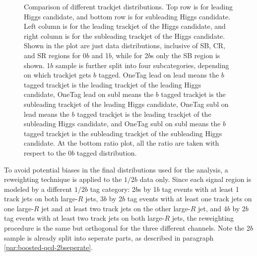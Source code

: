 \begin{figure}[htbp!]
\begin{center}
\caption{Comparison of different trackjet \pt distributions. Top row is for leading \pt Higgs candidate, and bottom row is for subleading \pt Higgs candidate. Left column is for the leading \pt trackjet of the Higgs candidate, and right column is for the subleading \pt trackjet of the Higgs candidate. Shown in the plot are just data distributions, inclusive of SB, CR, and SR regions for 0$b$ and 1$b$, while for 2$b$s only the SB region is shown. 1$b$ sample is further split into four subcategories, depending on which trackjet gets $b$ tagged. OneTag lead on lead means the $b$ tagged trackjet is the leading trackjet of the leading Higgs candidate, OneTag lead on subl means the $b$ tagged trackjet is the subleading trackjet of the leading Higgs candidate, OneTag subl on lead means the $b$ tagged trackjet is the leading trackjet of the subleading Higgs candidate, and OneTag subl on subl means the $b$ tagged trackjet is the subleading trackjet of the subleading Higgs candidate. At the bottom ratio plot, all the ratio are taken with respect to the 0$b$ tagged distribution.}
\label{fig:rw-2bs-comp}
\end{center}
\end{figure}

To avoid potential biases in the final distributions used for the analysis, a reweighting technique is applied to the $1/2b$ data only. Since each signal region is modeled by a different $1/2b$ tag category: 2$b$s by 1$b$ tag events with at least 1 track jets on both large-$R$ jets, 3$b$ by 2$b$ tag events with at least one track jets on one large-$R$ jet and at least two track jets on the other large-$R$ jet, and 4$b$ by 2$b$ tag events with at least two track jets on both large-$R$ jets, the reweighting procedure is the same but orthogonal for the three different channels. Note the 2$b$ sample is already split into seperate parts, as described in paragraph \ref{par:boosted-qcd-2bseperate}.

